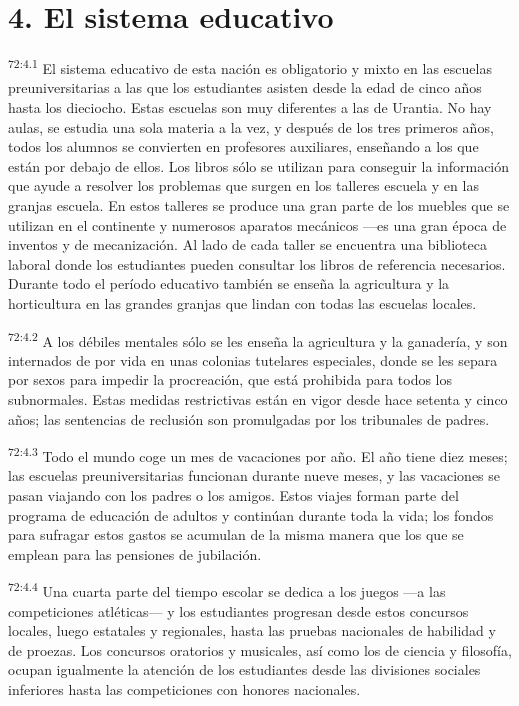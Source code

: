 \documentclass[twoside, 11pt]{book}
\begin{document}
\section*{4. El sistema educativo}
\par
\textsuperscript{72:4.1} El sistema educativo de esta nación es obligatorio y mixto en las escuelas preuniversitarias a las que los estudiantes asisten desde la edad de cinco años hasta los dieciocho. Estas escuelas son muy diferentes a las de Urantia. No hay aulas, se estudia una sola materia a la vez, y después de los tres primeros años, todos los alumnos se convierten en profesores auxiliares, enseñando a los que están por debajo de ellos. Los libros sólo se utilizan para conseguir la información que ayude a resolver los problemas que surgen en los talleres escuela y en las granjas escuela. En estos talleres se produce una gran parte de los muebles que se utilizan en el continente y numerosos aparatos mecánicos ---es una gran época de inventos y de mecanización. Al lado de cada taller se encuentra una biblioteca laboral donde los estudiantes pueden consultar los libros de referencia necesarios. Durante todo el período educativo también se enseña la agricultura y la horticultura en las grandes granjas que lindan con todas las escuelas locales.

\par
\textsuperscript{72:4.2} A los débiles mentales sólo se les enseña la agricultura y la ganadería, y son internados de por vida en unas colonias tutelares especiales, donde se les separa por sexos para impedir la procreación, que está prohibida para todos los subnormales. Estas medidas restrictivas están en vigor desde hace setenta y cinco años; las sentencias de reclusión son promulgadas por los tribunales de padres.

\par
\textsuperscript{72:4.3} Todo el mundo coge un mes de vacaciones por año. El año tiene diez meses; las escuelas preuniversitarias funcionan durante nueve meses, y las vacaciones se pasan viajando con los padres o los amigos. Estos viajes forman parte del programa de educación de adultos y continúan durante toda la vida; los fondos para sufragar estos gastos se acumulan de la misma manera que los que se emplean para las pensiones de jubilación.

\par
\textsuperscript{72:4.4} Una cuarta parte del tiempo escolar se dedica a los juegos ---a las competiciones atléticas--- y los estudiantes progresan desde estos concursos locales, luego estatales y regionales, hasta las pruebas nacionales de habilidad y de proezas. Los concursos oratorios y musicales, así como los de ciencia y filosofía, ocupan igualmente la atención de los estudiantes desde las divisiones sociales inferiores hasta las competiciones con honores nacionales.
\end{document}
